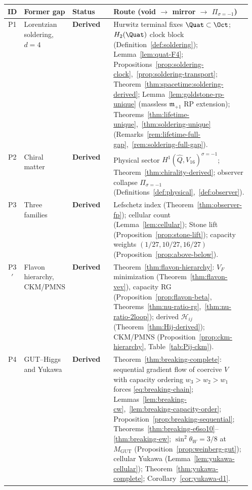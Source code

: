 \begin{table}[ht]
\centering
\small
\renewcommand{\arraystretch}{1.12}
\begin{tabular}{@{}clp{0.18\linewidth}p{0.38\linewidth}@{}}
\toprule
\textbf{ID} & \textbf{Former gap} & \textbf{Status} & \textbf{Route (void $\to$ mirror $\to$ $\Pi_{\sigma=-1}$)} \\
\midrule
P1 &
  Lorentzian soldering, $d=4$ &
  \textbf{Derived} &
  Hurwitz terminal fixes $\Quat\subset\Oct$; $H_2(\Quat)$ clock block
  (Definition~\ref{def:soldering}); Lemma~\ref{lem:quat-F4};
  Propositions~\ref{prop:soldering-clock},~\ref{prop:soldering-transport};
  Theorem~\ref{thm:spacetime:soldering-derived};
  Lemma~\ref{lem:goldstone-rp-unique} (massless $\mathfrak{m}_{+1}$ RP extension);
  Theorems~\ref{thm:lifetime-unique},~\ref{thm:soldering-unique}
  (Remarks~\ref{rem:lifetime-full-gap},~\ref{rem:soldering-full-gap}). \\
\addlinespace
P2 &
  Chiral matter &
  \textbf{Derived} &
  Physical sector $H^1(\hat Q,V_{16})^{\sigma=-1}$;
  Theorem~\ref{thm:chirality-derived}; observer collapse
  $\Pi_{\sigma=-1}$ (Definitions~\ref{def:physical},~\ref{def:observer}). \\
\addlinespace
P3 &
  Three families &
  \textbf{Derived} &
  Lefschetz index (Theorem~\ref{thm:observer-fp});
  cellular count (Lemma~\ref{lem:cellular}); Stone lift
  (Proposition~\ref{prop:stone-lift}); capacity weights
  $(1/27,10/27,16/27)$ (Proposition~\ref{prop:above-below}). \\
\addlinespace
P3$'$ &
  Flavon hierarchy, CKM/PMNS &
  \textbf{Derived} &
  Theorem~\ref{thm:flavon-hierarchy}: $V_F$ minimization
  (Theorem~\ref{thm:flavon-vev}), capacity RG
  (Proposition~\ref{prop:flavon-beta},
  Theorems~\ref{thm:nu-ratio-rg},~\ref{thm:nu-ratio-2loop});
  derived $\mathcal{H}_{ij}$ (Theorem~\ref{thm:Hij-derived});
  CKM/PMNS (Proposition~\ref{prop:ckm-hierarchy},
  Table~\ref{tab:Pij-ckm}). \\
\addlinespace
P4 &
  GUT--Higgs and Yukawa &
  \textbf{Derived} &
  Theorem~\ref{thm:breaking-complete}: sequential gradient flow of coercive $V$
  with capacity ordering $w_3>w_2>w_1$ forces \eqref{eq:breaking-chain};
  Lemmas~\ref{lem:breaking-cw},~\ref{lem:breaking-capacity-order};
  Proposition~\ref{prop:breaking-sequential};
  Theorems~\ref{thm:breaking-e6so10}--\ref{thm:breaking-ew};
  $\sin^2\theta_W=3/8$ at $M_{\mathrm{GUT}}$ (Proposition~\ref{prop:weinberg-gut});
  cellular Yukawa (Lemma~\ref{lem:yukawa-cellular});
  Theorem~\ref{thm:yukawa-complete}; Corollary~\ref{cor:yukawa-d1}. \\

\end{tabular}
\end{table}
